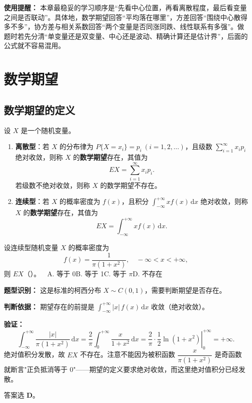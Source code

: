 ﻿\documentclass[lang=cn,11pt]{elegantbook}
\begin{document}
\begin{note}
\textbf{使用提醒：} 本章最稳妥的学习顺序是“先看中心位置，再看离散程度，最后看变量之间是否联动”。具体地，数学期望回答“平均落在哪里”，方差回答“围绕中心散得多不多”，协方差与相关系数回答“两个变量是否同涨同跌、线性联系有多强”。做题时若先分清“单变量还是双变量、中心还是波动、精确计算还是估计界”，后面的公式就不容易混用。
\end{note}

\section{数学期望}

\subsection{数学期望的定义}

\begin{definition}[数学期望] \label{def:expectation}
设 \(X\) 是一个随机变量。
\begin{enumerate}
    \item \textbf{离散型}：若 \(X\) 的分布律为 \(P\{X=x_i\} = p_i\ (i=1,2,\dots)\)，且级数 \(\sum\limits_{i=1}^{\infty} x_i p_i\) 绝对收敛，则称 \(X\) 的\textbf{数学期望}存在，其值为
    \[
    EX = \sum_{i=1}^{\infty} x_i p_i.
    \]
    若级数不绝对收敛，则称 \(X\) 的数学期望不存在。
    \item \textbf{连续型}：若 \(X\) 的概率密度为 \(f(x)\)，且积分 \(\int_{-\infty}^{+\infty} x f(x)\,\mathrm{d}x\) 绝对收敛，则称 \(X\) 的\textbf{数学期望}存在，其值为
    \[
    EX = \int_{-\infty}^{+\infty} x f(x)\,\mathrm{d}x.
    \]
\end{enumerate}
\end{definition}

\begin{exercise}\label{exer:4-3-cauchy}
设连续型随机变量 \(X\) 的概率密度为
\[
f(x) = \frac{1}{\pi(1+x^2)}, \quad -\infty < x < +\infty,
\]
则 \(EX\)（\quad）。~~A. 等于 0\quad B. 等于 1\quad C. 等于 \(\pi\)\quad D. 不存在
\end{exercise}
\begin{solution}
\textbf{题型识别：} 这是标准的柯西分布 $X\sim C(0,1)$，需要判断期望是否存在。

\textbf{判断依据：} 期望存在的前提是 $\displaystyle\int_{-\infty}^{+\infty} |x|\,f(x)\,\mathrm{d}x$ 收敛（绝对收敛）。

\textbf{验证：}
\[
\int_{-\infty}^{+\infty} \frac{|x|}{\pi(1+x^2)}\,\mathrm{d}x = \frac{2}{\pi}\int_0^{+\infty}\frac{x}{1+x^2}\,\mathrm{d}x = \frac{2}{\pi}\cdot\left.\frac{1}{2}\ln(1+x^2)\right|_0^{+\infty} = +\infty.
\]
绝对值积分发散，故 $EX$ 不存在。注意不能因为被积函数 $\dfrac{x}{\pi(1+x^2)}$ 是奇函数就断言"正负抵消等于 0"——期望的定义要求绝对收敛，而这里绝对值积分已经发散。

答案选 \textbf{D}。
\end{solution}
\end{document}
